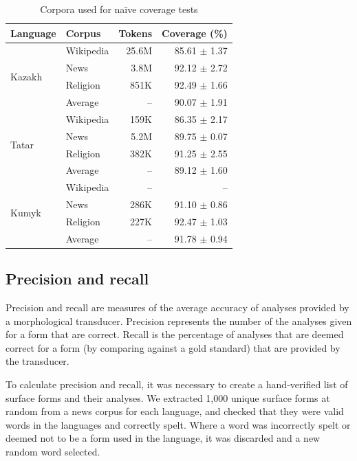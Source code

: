 \documentclass[a4paper,11pt,twocolumn]{article}
\begin{document}
\begin{table}
\begin{center}
\begin{tabular}{llrr}
\toprule
\textbf{Language} & \textbf{Corpus} & \textbf{Tokens} & \textbf{Coverage} (\%) \\
\midrule
\multirow{4}{*}{Kazakh} & Wikipedia & 25.6M & 85.61 $\pm$ 1.37 \\
	& News & 3.8M & 92.12 $\pm$ 2.72  \\
	& Religion & 851K & 92.49 $\pm$ 1.66 \\\cline{2-4}
	& Average & -- & 90.07 $\pm$ 1.91 \\
\midrule
\multirow{4}{*}{Tatar} & Wikipedia & 159K & 86.35 $\pm$ 2.17 \\
	& News & 5.2M & 89.75 $\pm$ 0.07 \\
	& Religion & 382K & 91.25 $\pm$ 2.55 \\\cline{2-4}
	& Average & -- & 89.12 $\pm$ 1.60 \\
\midrule
\multirow{4}{*}{Kumyk} & Wikipedia & -- & -- \\
        & News & 286K &  91.10 $\pm$ 0.86 \\
	& Religion & 227K & 92.47 $\pm$ 1.03 \\\cline{2-4}
	& Average & -- & 91.78 $\pm$ 0.94 \\
\bottomrule
\end{tabular}
 \caption{Corpora used for naïve coverage tests}
 \label{table:corpora}
\end{center}
\vspace{-2.5em}
\end{table}

\subsection{Precision and recall}

Precision and recall are measures of the average accuracy of analyses provided by a morphological transducer.  Precision represents the number of the analyses given for a form that are correct.  Recall is the percentage of analyses that are deemed correct for a form (by comparing against a gold standard) that are provided by the transducer.

To calculate precision and recall, it was necessary to create a hand-verified list of surface forms and their analyses.  We extracted 1,000 unique surface forms at random from a news corpus for each language, and checked that they were valid words in the languages and correctly spelt.  Where a word was incorrectly spelt or deemed not to be a form used in the language, it was discarded and a new random word selected.
\end{document}
